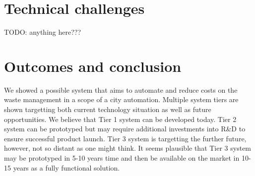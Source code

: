 \documentclass{article}
\begin{document}
\section{Technical challenges}
TODO: anything here???

\section{Outcomes and conclusion}

We showed a possible system that aims to automate and reduce costs on the waste management in a
scope of a city automation. Multiple system tiers are shown targetting both current technology
situation as well as future opportunities. We believe that Tier 1 system can be developed today.
Tier 2 system can be prototyped but may require additional investments into R\&D to ensure
successful product launch. Tier 3 system is targetting the further future, however, not so distant
as one might think. It seems plausible that Tier 3 system may be prototyped in 5-10 years time and
then be available on the market in 10-15 years as a fully functional solution.
\end{document}
